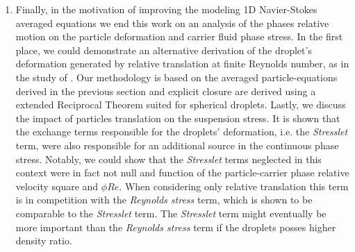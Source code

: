 \begin{enumerate}
\item Finally,  in the motivation of improving the modeling 1D Navier-Stokes averaged equations we end this work on an analysis of the phases relative motion on the particle deformation and carrier fluid phase stress. 
In the first place, we could demonstrate an alternative derivation of the droplet's deformation generated by relative translation at finite Reynolds number, as in the study of \citet{taylor1964deformation}. 
Our methodology is based on the averaged particle-equations derived in the previous section and explicit closure are derived using a extended Reciprocal Theorem suited for spherical droplets. 
Lastly, we discuss the impact of particles translation on the suspension stress. 
It is shown that the exchange terms responsible for the droplets' deformation, i.e. the \textit{Stresslet} term, were also responsible for an additional source in the continuous phase stress. 
Notably, we could show that the \textit{Stresslet} terms neglected in this context were in fact not null and function of the particle-carrier phase relative velocity square and $\phi Re$.  
When considering only relative translation this term is in competition with the \textit{Reynolds stress} term, which is shown to be comparable to the \textit{Stresslet} term. 
The \textit{Stresslet} term might eventually be more important than the \textit{Reynolds stress} term if the droplets posses higher density ratio. 
\end{enumerate}
